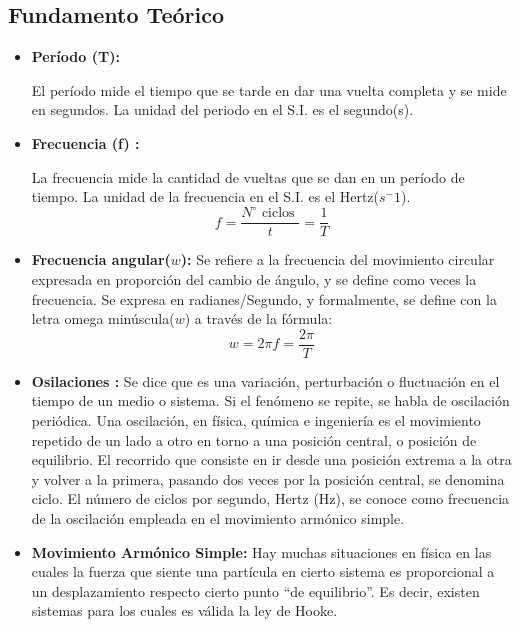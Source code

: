 \subsection{Fundamento Teórico}
\begin{itemize}
	\item \textbf{Período (T):}

	      El período mide el tiempo que se tarde en dar una vuelta completa y se mide en segundos.
	      La unidad del periodo en el S.I. es el segundo(s).
	\item \textbf{Frecuencia (f) :}

	      La frecuencia mide la cantidad de vueltas que se dan en un período de tiempo. La unidad de
	      la frecuencia en el S.I. es el Hertz($s^-1$).
	      \begin{equation*}
		      f=\dfrac{N^{\circ} \text { ciclos }}{t}=\dfrac{1}{T}
	      \end{equation*}
	\item \textbf{Frecuencia angular($w$):}
	      Se refiere a la frecuencia del movimiento circular expresada en proporción del cambio de
	      ángulo, y se define como veces la frecuencia. Se expresa en radianes/Segundo, y formalmente,
	      se define con la letra omega minúscula($w$) a través de la fórmula:
	      \begin{equation*}
		      w=2\pi f=\dfrac{2\pi}T
	      \end{equation*}
	\item \textbf{Osilaciones :}
	      Se dice que es una variación, perturbación o fluctuación en el tiempo de un medio o sistema. Si
	      el fenómeno se repite, se habla de oscilación periódica.
	      Una oscilación, en física, química e ingeniería es el movimiento repetido de un lado a otro en
	      torno a una posición central, o posición de equilibrio. El recorrido que consiste en ir desde una
	      posición extrema a la otra y volver a la primera, pasando dos veces por la posición central, se
	      denomina ciclo. El número de ciclos por segundo, Hertz (Hz), se conoce como frecuencia de la
	      oscilación empleada en el movimiento armónico simple.
	\item \textbf{Movimiento Armónico Simple:}
	      Hay muchas situaciones en física en las cuales la fuerza que siente una partícula en cierto
	      sistema es proporcional a un desplazamiento respecto cierto punto “de equilibrio”. Es decir,
	      existen sistemas para los cuales es válida la ley de Hooke.
	      \begin{equation*}

\end{equation*}
\end{itemize}
